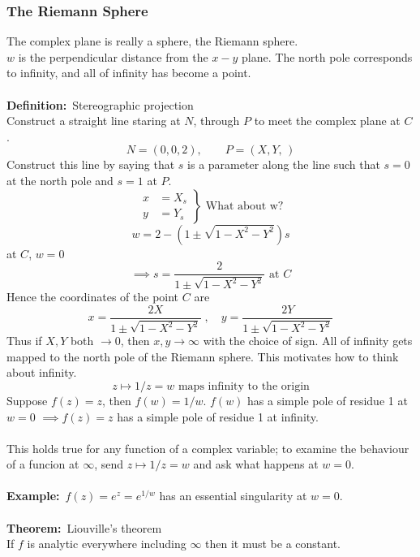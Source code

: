 \documentclass{article}
\newcommand{\definition}{\textbf{Definition:}}
\newcommand{\example}{\textbf{Example:}}
\newcommand{\theorem}{\textbf{Theorem:}}
\begin{document}
\subsubsection*{The Riemann Sphere}
The complex plane is really a sphere, the Riemann sphere.
\\
$w$ is the perpendicular distance from the $x-y$ plane.
The north pole corresponds to infinity, and all of infinity 
has become a point.
\\
\\
\definition\ Stereographic projection
\\
Construct a straight line staring at $N$, through $P$ to meet the
complex plane at $C$.
\[ N = (0,0,2), \qquad P = (X,Y,\,) \]
Construct this line by saying that $s$ is a parameter along the line 
such that $s=0$ at the north pole and $s=1$ at $P$.
\[ \left. \begin{array}{cc}
x &= X_s \\
y &= Y_s \end{array} \right\} \mbox{ What about w?} \]
\[ w = 2 - (1 \pm \sqrt{1-X^2-Y^2})s \]
at $C$, $w=0$
\[ \implies s = \frac{2}{1 \pm \sqrt{1 - X^2 -Y^2}} \mbox{ at } C \]
Hence the coordinates of the point $C$ are
\[ x= \frac{2X}{1 \pm \sqrt{1 - X^2 -Y^2}} \;, \quad
 y= \frac{2Y}{1 \pm \sqrt{1 - X^2 -Y^2}} \]
Thus if $X,Y$ both $\to 0$, then $x,y \to \infty$ with the choice of sign.
All of infinity gets mapped to the north pole of the Riemann sphere. This
motivates how to think about infinity.
\[ z \mapsto 1/z = w \mbox{ maps infinity to the origin} \]
Suppose $f(z)=z$, then $f(w) = 1/w$.
$f(w)$ has a simple pole of residue 1 at $w = 0$
$\implies f(z) = z$ has a simple pole of residue 1 at infinity.
\\
\\
This holds true for any function of a complex variable; to 
examine the behaviour of a funcion at $\infty$, send 
$z \mapsto 1/z = w$ and ask what happens at $w=0$.
\\
\\
\example\ $f(z) = e^z= e^{1/w}$ has an essential singularity at $w=0$.
\\
\\
\theorem\ Liouville's theorem
\\
If $f$ is analytic everywhere including $\infty$ then it must be a constant.
\\
\\
\end{document}
